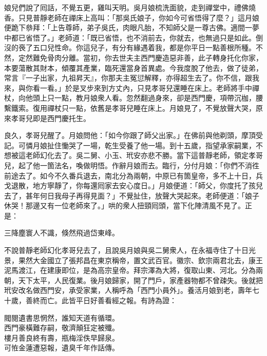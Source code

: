 娘兒們說了囘話，不覺五更，雞叫天明。吳月娘梳洗面貌，走到禪堂中，禮佛燒香。只見普靜老師在禪床上高叫：「那吳氏娘子，你如今可省悟得了麼？」這月娘便跪下叅拜：「上告尊師，弟子吳氏，肉眼凡胎，不知師父是一尊古佛。適間一夢中都已省悟了。」{}老師道：「既已省悟，也不消前去，你就去，也無過只是如此。倒沒的䘮了五口兒性命。你這兒子，有分有緣遇着我，都是你平日一點善根所種。不然，定然難免骨肉分離。當初，你去世夫主西門慶造惡非善，此子轉身托化你家，本要蕩散其財本，傾覆其產業，臨死還當身首異處。{}今我度脫了他去，做了徒弟，常言『一子出家，九祖昇天』，你那夫主冤愆解釋，亦得超生去了。你不信，跟我來，與你看一看。」於是叉步來到方丈內，只見孝哥兒還睡在床上。老師將手中禪杖，向他頭上只一點，教月娘衆人看。忽然翻過身來，卻是西門慶，項帶沉枷，腰繫鐵索。{}復用禪杖只一點，依舊是孝哥兒睡在床上。月娘見了，不覺放聲大哭，原來孝哥兒即是西門慶托生。{}

良久，孝哥兒醒了。月娘問他：「如今你跟了師父出家。」在佛前與他剃頭，摩頂受記。可憐月娘扯住慟哭了一場，乾生受養了他一場。到十五歲，指望承家嗣業，不想被這老師幻化去了。{}吳二舅、小玉、玳安亦悲不勝。當下這普靜老師，領定孝哥兒，起了他一箇法名，喚做明悟。{}作辭月娘而去。臨行，分付月娘：「你們不消徃前途去了。如今不久番兵退去，南北分為兩朝，中原已有箇皇帝，多不上十日，兵戈退散，地方寧靜了，你每還囘家去安心度日。」月娘便道：「師父，你度托了孩兒去了，甚年何日我母子再得見面？」不覺扯住，放聲大哭起來。老師便道：「娘子休哭！那邊又有一位老師來了。」哄的衆人扭頸囘頭，當下化陣清風不見了。正是：

\begin{myquote}
三降塵寰人不識，倏然飛過岱東峰。
\end{myquote}

不說普靜老師幻化孝哥兒去了，且說吳月娘與吳二舅衆人，在永福寺住了十日光景，果然大金國立了張邦昌在東京稱帝，置文武百官。徽宗、欽宗兩君北去，康王泥馬渡江，在建康即位，是為高宗皇帝。拜宗澤為大將，復取山東、河北。分為兩朝，天下太平，人民復業。後月娘歸家，開了門戶，家產器物都不曾疎失。後就把玳安改名做西門安，承受家業，人稱呼為「西門小員外」。{}養活月娘到老，壽年七十歲，善終而亡。此皆平日好善看經之報。有詩為證：

\begin{myquote}
閥閱遺書思惘然，誰知天道有循環。\\西門豪橫難存嗣，敬濟顛狂定被殲。\\樓月善良終有壽，瓶梅淫佚早歸泉。\\可恠金蓮遭惡報，遺臭千年作話傳。
\end{myquote}

